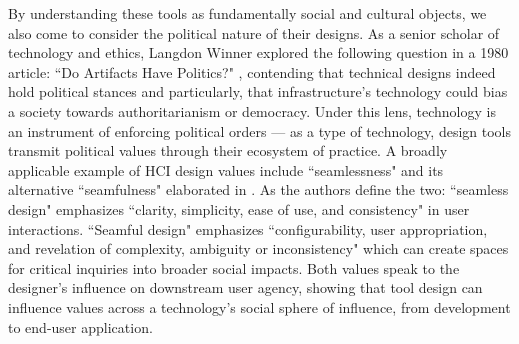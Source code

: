 By understanding these tools as fundamentally social and cultural objects, we also come to consider the political nature of their designs. As a senior scholar of technology and ethics, Langdon Winner explored the following question in a 1980 article: ``Do Artifacts Have Politics?" \cite{winner_artifacts_1980}, contending that technical designs indeed hold political stances and particularly, that infrastructure's technology could bias a society towards authoritarianism or democracy. Under this lens, technology is an instrument of enforcing political orders --- as a type of technology, design tools transmit political values through their ecosystem of practice. A broadly applicable example of HCI design values include ``seamlessness" and its alternative ``seamfulness" elaborated in \todo{[62]}. As the authors define the two: ``seamless design" emphasizes ``clarity, simplicity, ease of use, and consistency" in user interactions. ``Seamful design" emphasizes ``configurability, user appropriation, and revelation of complexity, ambiguity or inconsistency" which can create spaces for critical inquiries into broader social impacts. Both values speak to the designer's influence on downstream user agency, showing that tool design can influence values across a technology's social sphere of influence, from development to end-user application. 


